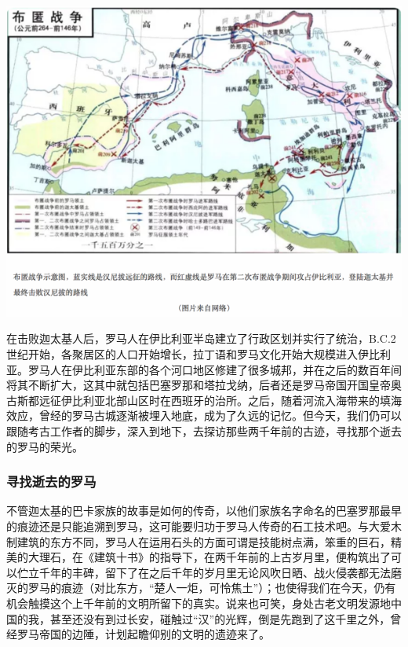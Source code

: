 \documentclass[
]{book}
\begin{document}
\includegraphics[width=8.33in]{images/xt12}

在击败迦太基人后，罗马人在伊比利亚半岛建立了行政区划并实行了统治，B.C.2世纪开始，各聚居区的人口开始增长，拉丁语和罗马文化开始大规模进入伊比利亚。罗马人在伊比利亚东部的各个河口地区修建了很多城邦，并在之后的数百年间将其不断扩大，这其中就包括巴塞罗那和塔拉戈纳，后者还是罗马帝国开国皇帝奥古斯都远征伊比利亚北部山区时在西班牙的治所。之后，随着河流入海带来的填海效应，曾经的罗马古城逐渐被埋入地底，成为了久远的记忆。但今天，我们仍可以跟随考古工作者的脚步，深入到地下，去探访那些两千年前的古迹，寻找那个逝去的罗马的荣光。

\hypertarget{ux5bfbux627eux901dux53bbux7684ux7f57ux9a6c}{%
\subsubsection{寻找逝去的罗马}\label{ux5bfbux627eux901dux53bbux7684ux7f57ux9a6c}}

不管迦太基的巴卡家族的故事是如何的传奇，以他们家族名字命名的巴塞罗那最早的痕迹还是只能追溯到罗马，这可能要归功于罗马人传奇的石工技术吧。与大爱木制建筑的东方不同，罗马人在运用石头的方面可谓是技能树点满，笨重的巨石，精美的大理石，在《建筑十书》的指导下，在两千年前的上古岁月里，便构筑出了可以伫立千年的丰碑，留下了在之后千年的岁月里无论风吹日晒、战火侵袭都无法磨灭的罗马的痕迹（对比东方，``楚人一炬，可怜焦土''）；也使得我们在今天，仍有机会触摸这个上千年前的文明所留下的真实。说来也可笑，身处古老文明发源地中国的我，甚至还没有到过长安，碰触过``汉''的光辉，倒是先跑到了这千里之外，曾经罗马帝国的边陲，计划起瞻仰别的文明的遗迹来了。
\end{document}
